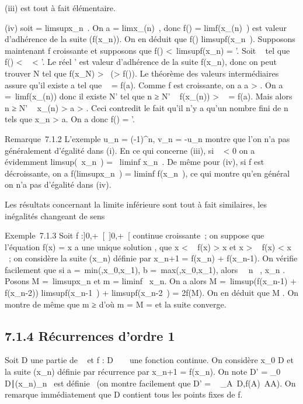 \documentclass[]{article}
\begin{document}
(iii) est tout à fait élémentaire.

(iv) soit \ell = limsupx_n~. On a \ell
= limx_\phi(n)~, donc f(\ell)
= limf(x_\phi(n)~) est valeur d'adhérence
de la suite (f(x_n)). On en déduit que f(\ell)
\leq limsupf(x_n~). Supposons maintenant
f croissante et supposons que f(\ell) <\
limsupf(x_n) = \ell'. Soit \alpha~ tel que f(\ell) < \alpha~
< \ell'. Le réel \ell' est valeur d'adhérence de la suite
f(x_n), donc on peut trouver N tel que f(x_N)
> \alpha~(> f(\ell)). Le théorème des valeurs
intermédiaires assure qu'il existe a tel que \alpha~ = f(a). Comme f est
croissante, on a a > \ell. On a \ell =\
limf(x_\phi(n)) donc il existe N' tel que n ≥ N' \rigtharrow~
f(x_\phi(n)) > \alpha~ = f(a). Mais alors n ≥ N' \rigtharrow~
x_\phi(n) > a > \ell. Ceci contredit le
fait qu'il n'y a qu'un nombre fini de n tels que x_n
> a. On a donc f(\ell) = \ell'.

Remarque~7.1.2 L'exemple u_n = (-1)^n, v_n
= -u_n montre que l'on n'a pas généralement d'égalité dans (i).
En ce qui concerne (iii), si \lambda~ < 0 on a évidemment
limsup(\lambda~x_n~) =
\lambda~liminf x_n~. De même pour (iv), si f
est décroissante, on a f(limsupx_n~)
= liminf f(x_n~), ce qui montre qu'en
général on n'a pas d'égalité dans (iv).

Les résultats concernant la limite inférieure sont tout à fait
similaires, les inégalités changeant de sens

Exemple~7.1.3 Soit f :]0,+\infty~[\rightarrow~]0,+\infty~[ continue croissante~; on
suppose que l'équation f(x) = x  a une unique
solution \ell, que x < \ell \rigtharrow~ f(x) > x
\over 2 et x > \ell \rigtharrow~ f(x) < x
\over 2 ~; on considère la suite (x_n) définie
par x_n+1 = f(x_n) + f(x_n-1). On vérifie
facilement que si a =\
min(\ell,x_0,x_1), b =\
max(\ell,x_0,x_1), alors \forall~~n \in
\mathbb{N}~, x_n \in [a,b]. Posons M =\
limsupx_n et m = liminf~
x_n. On a alors M =\
limsup(f(x_n-1) + f(x_n-2))
\leq limsupf(x_n-1~)
+ limsupf(x_n-2~) = 2f(M). On en
déduit que M \leq \ell. On montre de même que m ≥ \ell d'où m = M = \ell et la suite
converge.

\subsection{7.1.4 Récurrences d'ordre 1}

Soit D une partie de \mathbb{R}~ et f : D \rightarrow~ ~ une fonction continue. On considère
x_0 \in D et la suite (x_n) définie par récurrence par
x_n+1 = f(x_n). On note D' =
\x_0 \in
D∣(x_n)_n\in\mathbb{N}~\text
est définie \ (on montre facilement que D'
= \⋃ ~
_A\subset~D,f(A)\subset~AA). On remarque immédiatement que D contient tous les
points fixes de f.
\end{document}
